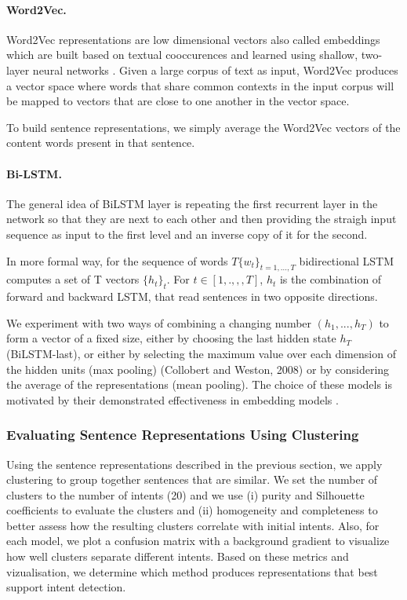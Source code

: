 \documentclass[11pt]{article}
\begin{document}
\paragraph{Word2Vec.} Word2Vec representations are low dimensional vectors also called embeddings which are built based on textual
cooccurences and learned using shallow, two-layer neural networks
\cite{Mikolov2013EfficientEO}. Given a large corpus of text as input,
Word2Vec produces a vector space where words that share common
contexts in the input corpus will be mapped to vectors that are close
to one another in the vector space.


To build sentence representations, we simply average the Word2Vec
vectors of the content words present in that sentence.

\paragraph{Bi-LSTM.} The general idea of BiLSTM layer is repeating the first recurrent layer in the network so that they are next to each other and then providing the straigh input sequence as input to the first level and an inverse copy of it for the second.

In more formal way, for the sequence of words $T \{w_{t}\}_{t = 1, ..., T}$ bidirectional LSTM computes a set of T vectors $\{h_{t}\}_{t}$. For $t ∈ [1 ,. ,,, T]$, $h_{t}$ is the combination of forward and backward LSTM, that read sentences in two opposite directions. 

We experiment with two ways of combining a changing number $(h_{1}, ..., h_{T})$ to form a vector of a fixed size, either by choosing the last hidden state $h_{T}$ (BiLSTM-last), or either by selecting the maximum value over each dimension of the hidden units (max pooling) (Collobert and Weston, 2008) or by considering the average of the representations (mean pooling). The choice of these models is motivated by their demonstrated effectiveness in embedding models \cite{P18-1198}.


\subsubsection{Evaluating Sentence Representations Using Clustering}

Using the sentence representations described in the previous section,
we apply clustering to group together sentences that are similar.  We
set the number of clusters to the number of intents (20) and we use
(i) purity and Silhouette coefficients to evaluate the clusters
 and (ii) homogeneity and completeness to better assess how the
resulting clusters correlate with initial intents. Also, for each
model, we plot a confusion matrix with a background gradient to
visualize how well clusters separate different intents. Based on these
metrics and vizualisation, we determine which method produces
representations that best support intent detection.
\end{document}
